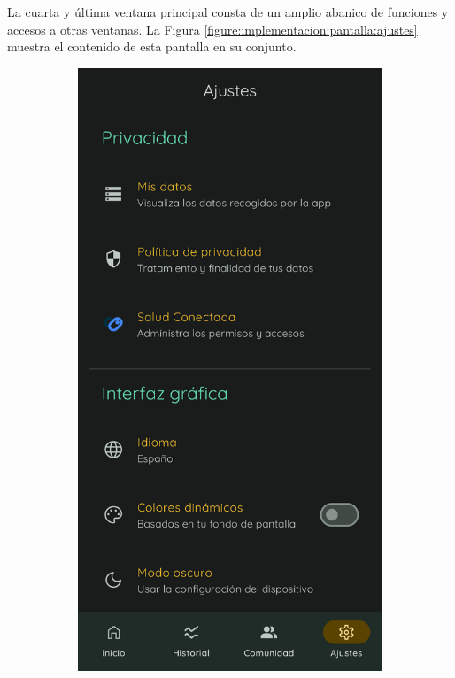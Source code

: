                 La cuarta y última ventana principal consta de un amplio abanico de funciones y accesos a otras ventanas. La Figura \ref{figure:implementacion:pantalla:ajustes} muestra el contenido de esta pantalla en su conjunto.
                
                \begin{figure}[htbp]
                	\centering
                	\begin{subfigure}[c]{0.29\textwidth}
                		\centering
                		\includegraphics[width=1\textwidth]{figures/pantallas/Ajustes 1.png}

\end{subfigure}
\end{figure}
